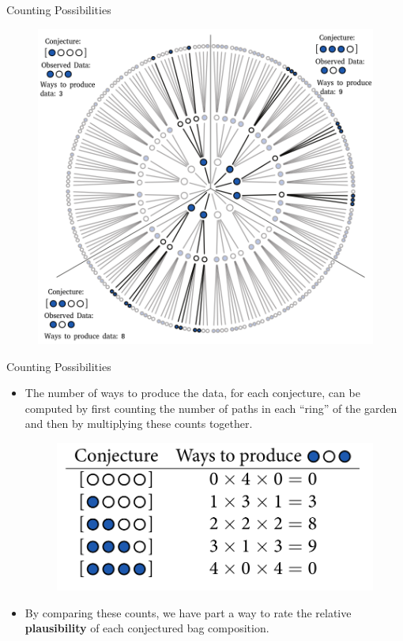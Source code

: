 \documentclass[handout]{beamer}
\begin{document}
\begin{frame}{Counting Possibilities}
\scriptsize{
\begin{figure}[h!]
	\centering
	\includegraphics[scale=0.35]{pics/marbles12.png}
\end{figure}
 } 
\end{frame}

\begin{frame}{Counting Possibilities}
\scriptsize{
\begin{itemize}
 \item The number of ways to produce the data, for each conjecture, can be computed by first counting the number of paths in each ``ring'' of the garden and then by multiplying these counts together.
 \begin{figure}[h!]
	\centering
	\includegraphics[scale=0.3]{pics/marbles15.png}
\end{figure}
\item By comparing these counts, we have part a way to rate the relative \textbf{plausibility} of each conjectured bag composition.
\end{itemize}
 } 
\end{frame}
\end{document}
